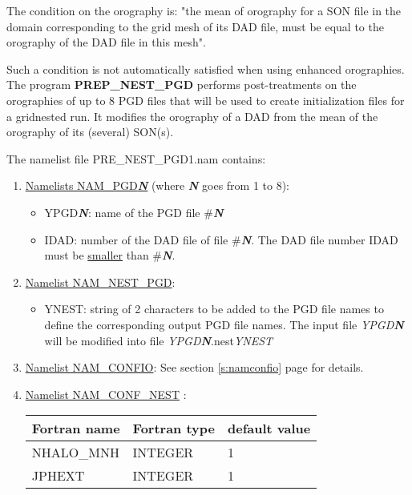The condition on the orography is:
"the mean of orography for a SON file in the domain corresponding to the
grid mesh of its DAD file, must be equal to the orography of the DAD file
in this mesh".

Such a condition is not automatically satisfied when using enhanced
orographies.
The program {\bf PREP\_NEST\_PGD} performs post-treatments on the orographies
of up to 8 PGD files that will be used to create initialization files 
for a gridnested run. It modifies the orography of a DAD from the mean
of the orography of its (several) SON(s).



The namelist file PRE\_NEST\_PGD1.nam contains:
\begin{enumerate}
\item
\underline{Namelists NAM\_PGD{\it \bf{N}}} (where {\it \bf{N}} goes from 1 to 8):
\begin{itemize}
\item YPGD{\it \bf{N}}: name of the PGD file \#{\it \bf{N}}
\item IDAD: number of the DAD file of file \#{\it \bf{N}}.
The DAD file number IDAD must be \underline{smaller} than \#{\it \bf{N}}.
\end{itemize}
\bigskip
\item
\underline{Namelist NAM\_NEST\_PGD}:
\begin{itemize}
\item
YNEST: string of 2 characters to be added to the PGD file names to define
the corresponding output PGD file names. The input file {\it YPGD{\bf N}}
will be modified into file {\it YPGD{\bf N}}.nest{\it YNEST}
\end{itemize}

\bigskip
\item
\underline{Namelist NAM\_CONFIO}:
See section \ref{s:namconfio} page \pageref{s:namconfio} for details.

\bigskip
\item
\underline{Namelist NAM\_CONF\_NEST} :
\begin{center}
\begin{tabular} {|l|l|l|}
\hline
Fortran name & Fortran type & default value\\
\hline
\hline
NHALO\_MNH  & INTEGER & 1 \\
JPHEXT      & INTEGER & 1 \\
\hline
\end{tabular}
\end{center}


\end{enumerate}
